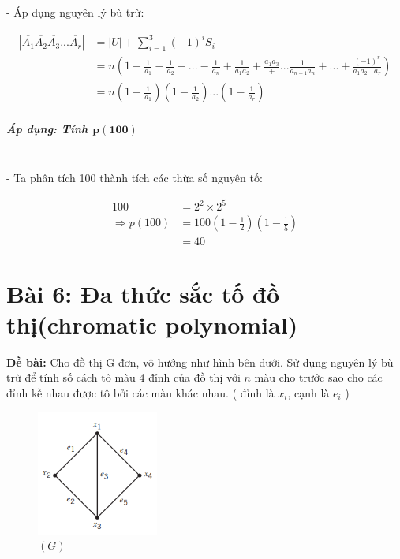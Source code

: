 \documentclass[12pt]{article}
\begin{document}
\begin{sloppypar}
- Áp dụng nguyên lý bù trừ:

\begin{align*}
    |\overline{A_{1}}\overline{A_{2}}\overline{A_{3}}...\overline{A_{r}}|   & = |U| + \sum_{i=1}^{3}(-1)^{i}S_{i} \\
    & = n\left(1-\frac{1}{a_{1}}-\frac{1}{a_{2}}-...-\frac{1}{a_{n}} + \frac{1}{a_{1}a_{2}} + \frac{a_{1}a_{3}}+...\frac{1}{a_{n-1}a_{n}}+...+\frac{(-1)^r}{a_{1}a_{2}...a_{r}}\right) \\
    & = n\left(1-\frac{1}{a_{1}}\right)\left(1-\frac{1}{a_{2}}\right)...\left(1-\frac{1}{a_{r}}\right)
\end{align*}

\subparagraph{Áp dụng: Tính \(\mathbf{p(100)}\) } \mbox{}\\

- Ta phân tích 100 thành tích các thừa số nguyên tố:

\begin{align*}
    100 & = 2^{2}\times 2^{5} \\
    \Rightarrow p(100) & = 100\left(1 - \frac{1}{2}\right)\left(1-\frac{1}{5}\right) \\
    & = 40
\end{align*}

\section{Bài 6: Đa thức sắc tố đồ thị(chromatic polynomial)}
\begin{tcolorbox}
    \textbf{Đề bài:} Cho đồ thị G đơn, vô hướng như hình bên dưới.  Sử dụng nguyên lý bù trừ để tính số cách tô màu 4 đỉnh của đồ thị với  \(n\) màu cho trước sao cho các đỉnh kề nhau được tô bởi các màu khác nhau. ( đỉnh là \(x_{i}\), cạnh là \(e_{i}\) )
\end{tcolorbox}

\begin{figure}[H]
    \centering
    \includegraphics[width=4cm]{ex6.png}
    \captionsetup{labelformat=empty}
    \caption{\((G)\)}   
  \end{figure}
  


\end{sloppypar}
\end{document}
